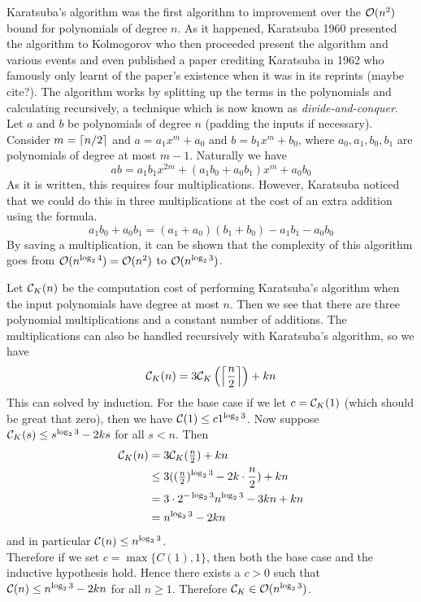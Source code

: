 Karatsuba's algorithm was the first algorithm to improvement over the $\mathcal O(n^2)$ bound for polynomials of degree $n$. As it happened, Karatsuba 1960 presented the algorithm to Kolmogorov who then proceeded present the algorithm and various events and even published a paper crediting Karatsuba in 1962 \cite{karatsuba} who famously only learnt of the paper's existence when it was in its reprints (maybe cite?). The algorithm works by splitting up the terms in the polynomials and calculating recursively, a technique which is now known as \emph{divide-and-conquer}. Let $a$ and $b$ be polynomials of degree $n$ (padding the inputs if necessary).\\
Consider $m = \left \lceil n/2 \right \rceil$ and $a = a_1x^m + a_0$ and $b = b_1x^m + b_0$, where $a_0, a_1, b_0, b_1$ are polynomials of degree at most $m - 1$. Naturally we have
\[
    ab = a_1b_1x^{2m} + (a_1b_0 + a_0b_1)x^m + a_0b_0
\]
As it is written, this requires four multiplications. However, Karatsuba noticed that we could do this in three multiplications at the cost of an extra addition using the formula.
\[
    a_1b_0 + a_0b_1 = (a_1 + a_0)(b_1 + b_0) - a_1b_1 - a_0b_0
\]
By saving a multiplication, it can be shown that the complexity of this algorithm goes from $\mathcal O(n^{\log_2 4}) = \mathcal O(n^2)$ to $\mathcal O(n^{\log_2 3})$.

Let $\mathcal C_K(n)$ be the computation cost of performing Karatsuba's algorithm when the input polynomials have degree at most $n$. Then we see that there are three polynomial multiplications and a constant number of additions. The multiplications can also be handled recursively with Karatsuba's algorithm, so we have
\[
    \mathcal C_K(n) = 3\mathcal C_K\left(\left \lceil \frac{n}{2} \right \rceil\right) + kn
\]
This can solved by induction. 
For the base case if we let $c = \mathcal C_K(1)$ (which should be great that zero), then we have $\mathcal C(1) \le c1^{\log_2 3}$. 
Now suppose $\mathcal C_K(s) \le s^{\log_2 3} - 2ks$ for all $s < n$. Then 
\begin{align*}
    \mathcal C_K(n) &= 3\mathcal C_K(\tfrac{n}{2}) + kn\\
                    &\le 3((\tfrac{n}{2})^{\log_2 3} - 2k \cdot \frac{n}{2}) + kn\\
                    &= 3 \cdot 2^{-\log_2 3}n^{\log_2 3} - 3kn + kn\\
                    &= n^{\log_2 3} - 2kn
\end{align*}
and in particular $\mathcal C(n) \le n^{\log_2 3}$.\\
Therefore if we set $c = \max\{C(1), 1\}$, then both the base case and the inductive hypothesis hold. Hence there exists a $c > 0$ such that $\mathcal C(n) \le n^{\log_2 3} - 2kn$ for all $n \ge 1$.
Therefore $\mathcal C_K \in \mathcal O(n^{\log_2 3})$.

